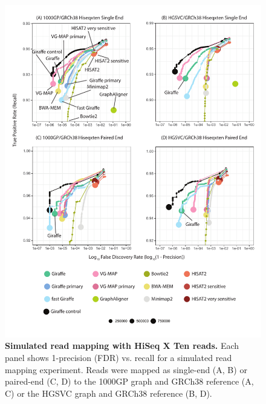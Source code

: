 \documentclass[11pt]{ucscthesis}
\begin{document}
\begin{figure}[H]
    \centering
    \includegraphics[width=.8\linewidth]{aim2_supplement_hiseqxten-all.pdf}
    \caption[Simulated read mapping with HiSeq X Ten reads]{\textbf{Simulated read mapping with HiSeq X Ten reads.} Each panel shows 1-precision (FDR) vs. recall for a simulated read mapping experiment. Reads were mapped as single-end (A, B) or paired-end (C, D) to the 1000GP graph and GRCh38 reference (A, C) or the HGSVC graph and GRCh38 reference (B, D).}
    \label{fig:aim2_supplement_hiseqxten_rocs}
\end{figure}
\end{document}
